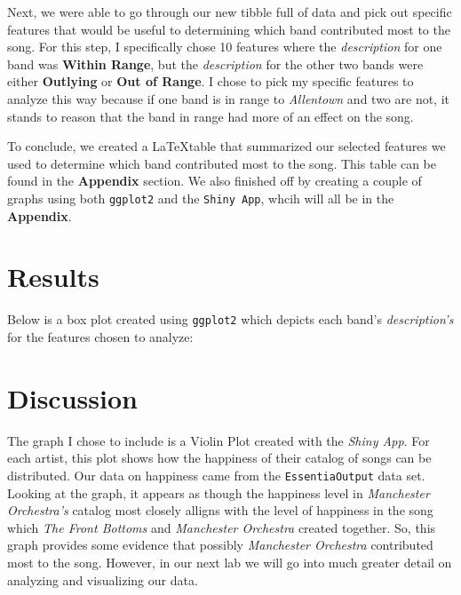 \documentclass{article}\usepackage[]{graphicx}\usepackage[]{xcolor}
\begin{document}
\begin{multicols}{2}
Next, we were able to go through our new tibble full of data and pick out specific features that would be useful to determining which band contributed most to the song. For this step, I specifically chose 10 features where the \textit{description} for one band was \textbf{Within Range}, but the \textit{description} for the other two bands were either \textbf{Outlying} or \textbf{Out of Range}. I chose to pick my specific features to analyze this way because if one band is in range to \textit{Allentown} and two are not, it stands to reason that the band in range had more of an effect on the song.
\par\indent
To conclude, we created a \LaTeX table that summarized our selected features we used to determine which band contributed most to the song. This table can be found in the \textbf{Appendix} section. We also finished off by creating a couple of graphs using both \texttt{ggplot2} and the \texttt{Shiny App}, whcih will all be in the \textbf{Appendix}.

\section{Results}
Below is a box plot created using \texttt{ggplot2} which depicts each band's \textit{description's} for the features chosen to analyze:





\section{Discussion}
The graph I chose to include is a Violin Plot created with the \textit{Shiny App}. For each artist, this plot shows how the happiness of their catalog of songs can be distributed. Our data on happiness came from the \texttt{EssentiaOutput} data set. Looking at the graph, it appears as though the happiness level in \textit{Manchester Orchestra's} catalog most closely alligns with the level of happiness in the song which \textit{The Front Bottoms} and \textit{Manchester Orchestra} created together. So, this graph provides some evidence that possibly \textit{Manchester Orchestra} contributed most to the song. However, in our next lab we will go into much greater detail on analyzing and visualizing our data.


\nocite{jsonlite}
\nocite{stringr}
\nocite{tidyverse}
\nocite{Essentia}
\nocite{Essentia2}
\nocite{Song}
\nocite{Shiny}
\nocite{LIWC}


\vspace{2em}
\begin{tiny}

\end{tiny}
\end{multicols}
\end{document}
